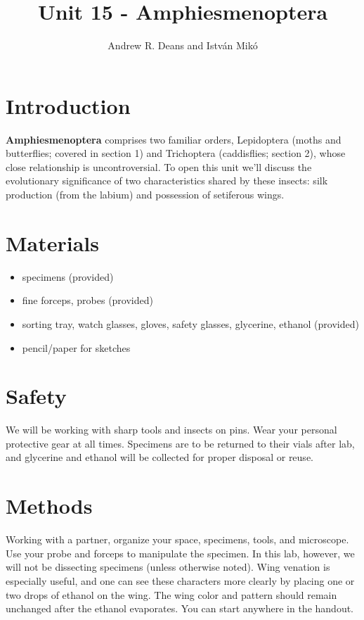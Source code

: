 \documentclass[letterpaper, 11pt]{article}
\title{Unit 15 - Amphiesmenoptera}
\author{Andrew R. Deans and Istv\'an Mik\'o}
\begin{document}
\cleanlookdateon %
\maketitle
\thispagestyle{fancy}

\section*{Introduction}
\textbf{Amphiesmenoptera} comprises two familiar orders, Lepidoptera (moths and butterflies; covered in section 1) and Trichoptera (caddisflies; section 2), whose close relationship is uncontroversial. To open this unit we'll discuss the evolutionary significance of two characteristics shared by these insects: silk production (from the labium) and possession of setiferous wings.


\section*{Materials}
\begin{itemize}
\item specimens (provided)
\item fine forceps, probes (provided)
\item sorting tray, watch glasses, gloves, safety glasses, glycerine, ethanol (provided)
\item pencil/paper for sketches
\end{itemize}

\section*{Safety}
We will be working with sharp tools and insects on pins. Wear your personal protective gear at all times. Specimens are to be returned to their vials after lab, and glycerine and ethanol will be collected for proper disposal or reuse.

\section*{Methods}
Working with a partner, organize your space, specimens, tools, and microscope. Use your probe and forceps to manipulate the specimen. In this lab, however, we will not be dissecting specimens (unless otherwise noted). Wing venation is especially useful, and one can see these characters more clearly by placing one or two drops of ethanol on the wing. The wing color and pattern should remain unchanged after the ethanol evaporates. You can start anywhere in the handout.
\end{document}
